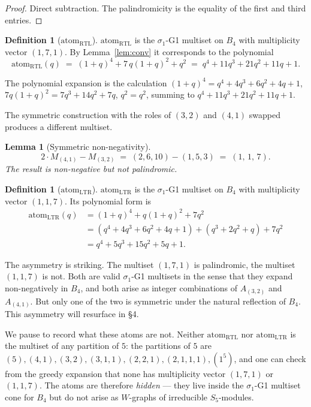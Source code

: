 \documentclass[11pt]{article}
\newtheorem{lemma}[theorem]{Lemma}
\theoremstyle{definition}
\newtheorem{definition}[theorem]{Definition}
\begin{document}
\begin{proof}
Direct subtraction. The palindromicity is the equality of the first and third entries.
\end{proof}

\begin{definition}[$\mathrm{atom}_{\mathrm{RTL}}$]
$\mathrm{atom}_{\mathrm{RTL}}$ is the $\sigma_1$-G1 multiset on $B_4$ with multiplicity vector $(1,7,1)$. By Lemma~\ref{lem:conv} it corresponds to the polynomial
\[
\mathrm{atom}_{\mathrm{RTL}}(q) \;=\; (1+q)^4 + 7\,q(1+q)^2 + q^2 \;=\; q^4 + 11q^3 + 21q^2 + 11q + 1.
\]
\end{definition}

The polynomial expansion is the calculation
$(1+q)^4 = q^4 + 4q^3 + 6q^2 + 4q + 1$, $7q(1+q)^2 = 7q^3 + 14q^2 + 7q$, $q^2 = q^2$, summing to $q^4 + 11q^3 + 21q^2 + 11q + 1$.

The symmetric construction with the roles of $(3,2)$ and $(4,1)$ swapped produces a different multiset.

\begin{lemma}[Symmetric non-negativity]\label{lem:atom-LTR}
\[
2\cdot M_{(4,1)} - M_{(3,2)} \;=\; (2,6,10) - (1,5,3) \;=\; (1,\,1,\,7).
\]
The result is non-negative but \emph{not} palindromic.
\end{lemma}

\begin{definition}[$\mathrm{atom}_{\mathrm{LTR}}$]
$\mathrm{atom}_{\mathrm{LTR}}$ is the $\sigma_1$-G1 multiset on $B_4$ with multiplicity vector $(1,1,7)$. Its polynomial form is
\begin{align*}
\mathrm{atom}_{\mathrm{LTR}}(q) &= (1+q)^4 + q(1+q)^2 + 7q^2 \\
&= (q^4 + 4q^3 + 6q^2 + 4q + 1) + (q^3 + 2q^2 + q) + 7q^2 \\
&= q^4 + 5q^3 + 15q^2 + 5q + 1.
\end{align*}
\end{definition}

The asymmetry is striking. The multiset $(1,7,1)$ is palindromic, the multiset $(1,1,7)$ is not. Both are valid $\sigma_1$-G1 multisets in the sense that they expand non-negatively in $B_4$, and both arise as integer combinations of $A_{(3,2)}$ and $A_{(4,1)}$. But only one of the two is symmetric under the natural reflection of $B_4$. This asymmetry will resurface in §4.

We pause to record what these atoms are not. Neither $\mathrm{atom}_{\mathrm{RTL}}$ nor $\mathrm{atom}_{\mathrm{LTR}}$ is the multiset of any partition of $5$: the partitions of $5$ are $(5), (4,1), (3,2), (3,1,1), (2,2,1), (2,1,1,1), (1^5)$, and one can check from the greedy expansion that none has multiplicity vector $(1,7,1)$ or $(1,1,7)$. The atoms are therefore \emph{hidden} — they live inside the $\sigma_1$-G1 multiset cone for $B_4$ but do not arise as $W$-graphs of irreducible $S_5$-modules.
\end{document}
